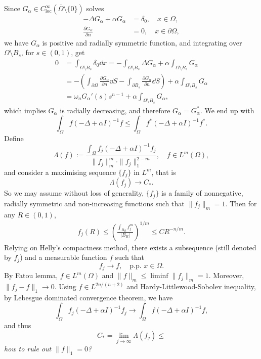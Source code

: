 Since $G_\alpha\in C^{\infty}_{\mathrm{loc}}(\overline{\Omega}\setminus\{0\})$ solves
\begin{align*}
	-\Delta G_\alpha + \alpha G_\alpha &= \delta_0, \quad x\in\Omega,\\
	\frac{\partial G_\alpha}{\partial n} &= 0,\quad x\in\partial\Omega,
\end{align*}
we have $G_\alpha$ is positive and radially symmetric function, 
and integrating over $\Omega\setminus B_s$, for $s\in(0,1)$, get 
\begin{align*}
	0 &= \int_{\Omega\setminus B_s} \delta_0\dd x 
		= - \int_{\Omega\setminus B_s} \Delta G_\alpha + \alpha\int_{\Omega\setminus B_s} G_\alpha\\
		&= -\left(\int_{\partial\Omega}\frac{\partial G_\alpha}{\partial n}\dd S 
			- \int_{\partial B_s}\frac{\partial G_\alpha}{\partial n}\dd S\right) 
			+ \alpha\int_{\Omega\setminus B_s} G_\alpha\\
		&= \omega_n G_\alpha'(s)s^{n-1} + \alpha\int_{\Omega\setminus B_s} G_\alpha,
\end{align*}  
which implies $G_\alpha$ is radially decreasing, and therefore $G_\alpha = G_\alpha^\ast$.
We end up with 
\[
\int_\Omega f(-\Delta + \alpha I)^{-1}f\leq \int_\Omega f^\ast(-\Delta +\alpha I)^{-1}f^\ast.
\]
Define 
\[
\Lambda(f) := \frac{\int_\Omega f_j(-\Delta + \alpha I)^{-1}f_j}{\|f_j\|_m^m\cdot\|f_j\|_1^{2-m}},
	\quad f\in L^m(\Omega),
\]
and consider a maximising sequence $\{f_j\}$ in $L^m$, that is
\[
\Lambda(f_j) \to C_\ast.
\]
So we may assume without loss of generality,
$\{f_j\}$ is a family of nonnegative, radially symmetric and non-increasing functions such that $\|f_j\|_m=1$. 
Then for any $R\in(0,1)$,
\begin{align*}
	f_j(R) \leq \left(\frac{\int_{B_R}f_j^m}{|B_R|}\right)^{1/m}
		\leq CR^{-n/m}.
\end{align*}
Relying on Helly's compactness method, there exists a subsequence (still denoted by $f_j$) 
and a measurable function $f$ such that 
\[
f_j \to f, \quad \text{p.p. } x\in\Omega.
\]
By Fatou lemma, $f\in L^m(\Omega)$ and $\|f\|_m\leq\liminf\|f_j\|_m = 1$. 
Moreover, $\|f_j-f\|_1 \to 0$.
Using $f\in L^{2n/(n+2)}$ and Hardy-Littlewood-Sobolev inequality, by Lebesgue dominated convergence theorem,
we have 
\[
\int_\Omega f_j(-\Delta + \alpha I)^{-1}f_j \to \int_\Omega f (-\Delta + \alpha I)^{-1}f,
\]
and thus 
\[
C_\ast = \lim_{j\to\infty}\Lambda(f_j) \leq 
\]
\emph{how to rule out $\|f\|_1 = 0$?}




